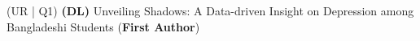 (UR | Q1) \textbf{(DL)}{ Unveiling Shadows: A Data-driven Insight on Depression among Bangladeshi  Students (\textbf{First Author})} \\
